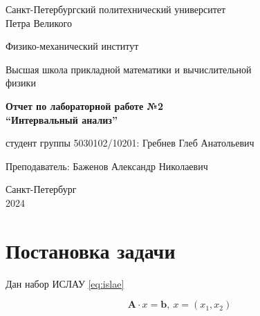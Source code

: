 \documentclass{article}
\begin{document}
  \begin{titlepage}
    \begin{center}
      Санкт-Петербургский политехнический университет \\Петра Великого
    \end{center}

    \begin{center}
      Физико-механический институт
    \end{center}

    \begin{center}
      Высшая школа прикладной математики и вычислительной\\ физики
    \end{center}

    \vspace{8em}

    \begin{center}
      \textbf{Отчет по лабораторной работе №2}\\
      \textbf{“Интервальный анализ”}
    \end{center}

    \vspace{\fill}

    \begin{flushright}
       студент группы 5030102/10201:
      \hfill
      Гребнев Глеб Анатольевич \\
    \end{flushright}
    Преподаватель: \hfill Баженов Александр Николаевич

    \vspace{12em}

    \begin{center}
      Санкт-Петербург\\
      2024
    \end{center}
  \end{titlepage}

  \tableofcontents

  \newpage

  \section{Постановка задачи}

  Дан набор ИСЛАУ \ref{eq:islae}

  \begin{equation} \label{eq:islae}
    \mathbf{A} \cdot x = \mathbf{b}, \ x = (x_1, x_2)
  \end{equation}
\end{document}
